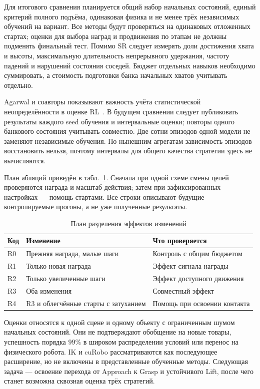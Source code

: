 \documentclass{misisarticle}
\begin{document}
Для итогового сравнения планируется общий набор начальных состояний, единый критерий полного подъёма, одинаковая физика и не менее трёх независимых обучений на вариант. Все методы будут проверяться на одинаковых отложенных стартах; оценки для выбора наград и продвижения по этапам не должны подменять финальный тест. Помимо SR следует измерять доли достижения хвата и высоты, максимальную длительность непрерывного удержания, частоту падений и нарушений состояния соседей. Бюджет отдельных навыков необходимо суммировать, а стоимость подготовки банка начальных хватов учитывать отдельно.

Agarwal и соавторы показывают важность учёта статистической неопределённости в оценке RL~\cite{rliable}. В будущем сравнении следует публиковать результаты каждого seed обучения и интервальные оценки; повторы одного банкового состояния учитывать совместно. Две сотни эпизодов одной модели не заменяют независимые обучения. По нынешним агрегатам зависимость эпизодов восстановить нельзя, поэтому интервалы для общего качества стратегии здесь не вычисляются.

План абляций приведён в табл.~\ref{tab:ablation}. Сначала при одной схеме смены целей проверяются награда и масштаб действия; затем при зафиксированных настройках --- помощь стартами. Все строки описывают будущие контролируемые прогоны, а не уже полученные результаты.
\begin{table}[tb]
\caption{План разделения эффектов изменений}
\label{tab:ablation}
\centering\small
\begin{tabular}{@{}p{}p{}p{}@{}}
\toprule
Код & Изменение & Что проверяется \\
\midrule
R0 & Прежняя награда, малые шаги & Контроль с общим бюджетом \\
R1 & Только новая награда & Эффект сигнала награды \\
R2 & Только увеличенные шаги & Эффект доступного движения \\
R3 & Оба изменения & Совместный эффект \\
R4 & R3 и облегчённые старты с затуханием & Помощь при освоении контакта \\
\bottomrule
\end{tabular}
\end{table}

Оценки относятся к одной сцене и одному объекту с ограниченным шумом начальных состояний. Они не подтверждают обобщение на новые товары, успешность порядка $99\%$ в широком распределении условий или перенос на физического робота. IK и cuRobo рассматриваются как последующее расширение, но не включены в представленные обученные методы. Следующая задача --- освоение перехода от Approach к Grasp и устойчивого Lift, после чего станет возможна сквозная оценка трёх стратегий.
\end{document}
